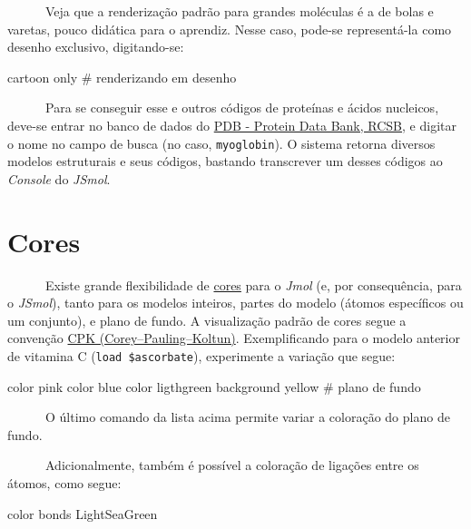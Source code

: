 \documentclass[
  letterpaper,
  DIV=11,
  numbers=noendperiod]{scrreprt}
\newenvironment{Shaded}{\begin{snugshade}}{\end{snugshade}}
\newcommand{\CommentTok}[1]{\textcolor[rgb]{0.37,0.37,0.37}{#1}}
\newcommand{\NormalTok}[1]{\textcolor[rgb]{0.00,0.23,0.31}{#1}}
\begin{document}
~~~~~~Veja que a renderização padrão para grandes moléculas é a de bolas
e varetas, pouco didática para o aprendiz. Nesse caso, pode-se
representá-la como desenho exclusivo, digitando-se:

\begin{Shaded}
\begin{Highlighting}[]
\NormalTok{cartoon only }\CommentTok{\# renderizando em desenho}
\end{Highlighting}
\end{Shaded}

~~~~~~Para se conseguir esse e outros códigos de proteínas e ácidos
nucleicos, deve-se entrar no banco de dados do
\href{https://www.rcsb.org/}{PDB - Protein Data Bank, RCSB}, e digitar o
nome no campo de busca (no caso, \texttt{myoglobin}). O sistema retorna
diversos modelos estruturais e seus códigos, bastando transcrever um
desses códigos ao \emph{Console} do \emph{JSmol}.

\section{Cores}\label{cores}

~~~~~~Existe grande flexibilidade de
\href{https://jmol.sourceforge.net/jscolors/}{cores} para o \emph{Jmol}
(e, por consequência, para o \emph{JSmol}), tanto para os modelos
inteiros, partes do modelo (átomos específicos ou um conjunto), e plano
de fundo. A visualização padrão de cores segue a convenção
\href{https://en.wikipedia.org/wiki/CPK_coloring}{CPK
(Corey--Pauling--Koltun)}. Exemplificando para o modelo anterior de
vitamina C (\texttt{load\ \$ascorbate}), experimente a variação que
segue:

\begin{Shaded}
\begin{Highlighting}[]
\NormalTok{color pink}
\NormalTok{color blue}
\NormalTok{color ligthgreen}
\NormalTok{background yellow }\CommentTok{\# plano de fundo}
\end{Highlighting}
\end{Shaded}

~~~~~~O último comando da lista acima permite variar a coloração do
plano de fundo.

~~~~~~Adicionalmente, também é possível a coloração de ligações entre os
átomos, como segue:

\begin{Shaded}
\begin{Highlighting}[]
\NormalTok{color bonds LightSeaGreen}
\end{Highlighting}
\end{Shaded}
\end{document}
